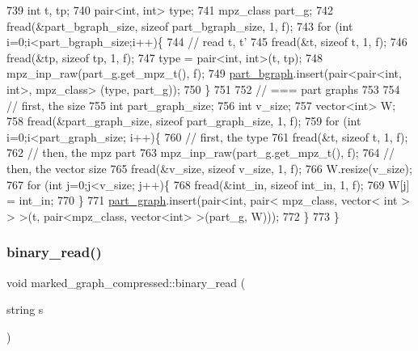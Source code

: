 \begin{DoxyCode}
739   \textcolor{keywordtype}{int} t, tp;
740   pair<int, int> type; 
741   mpz\_class part\_g; 
742   fread(&part\_bgraph\_size, \textcolor{keyword}{sizeof} part\_bgraph\_size, 1, f);
743   \textcolor{keywordflow}{for} (\textcolor{keywordtype}{int} i=0;i<part\_bgraph\_size;i++)\{
744     \textcolor{comment}{// read t, t'}
745     fread(&t, \textcolor{keyword}{sizeof} t, 1, f);
746     fread(&tp, \textcolor{keyword}{sizeof} tp, 1, f);
747     type = pair<int, int>(t, tp);
748     mpz\_inp\_raw(part\_g.get\_mpz\_t(), f);
749     \hyperlink{classmarked__graph__compressed_a7b3267063fba30b45eb21b3ba4e07536}{part\_bgraph}.insert(pair<pair<int, int>, mpz\_class> (type, part\_g));
750   \}
751 
752   \textcolor{comment}{// === part graphs}
753 
754   \textcolor{comment}{// first, the size}
755   \textcolor{keywordtype}{int} part\_graph\_size;
756   \textcolor{keywordtype}{int} v\_size;
757   vector<int> W; 
758   fread(&part\_graph\_size, \textcolor{keyword}{sizeof} part\_graph\_size, 1, f);
759   \textcolor{keywordflow}{for} (\textcolor{keywordtype}{int} i=0;i<part\_graph\_size; i++)\{
760     \textcolor{comment}{// first, the type}
761     fread(&t, \textcolor{keyword}{sizeof} t, 1, f);
762     \textcolor{comment}{// then, the mpz part}
763     mpz\_inp\_raw(part\_g.get\_mpz\_t(), f);
764     \textcolor{comment}{// then, the vector size}
765     fread(&v\_size, \textcolor{keyword}{sizeof} v\_size, 1, f);
766     W.resize(v\_size);
767     \textcolor{keywordflow}{for} (\textcolor{keywordtype}{int} j=0;j<v\_size; j++)\{
768       fread(&int\_in, \textcolor{keyword}{sizeof} int\_in, 1, f);
769       W[j] = int\_in;
770     \}
771     \hyperlink{classmarked__graph__compressed_ae179a4737e6eab905c18a94d44ef64b7}{part\_graph}.insert(pair<\textcolor{keywordtype}{int}, pair< mpz\_class, vector< int > > >(t, pair<mpz\_class, vector<int>
       >(part\_g, W)));
772   \}
773 \}
\end{DoxyCode}
\mbox{\label{classmarked__graph__compressed_a01c67fe4234738db6bb60459515c3ad8}} 
\subsubsection{\texorpdfstring{binary\+\_\+read()}{binary\_read()}\hspace{0.1cm}{\footnotesize\ttfamily [2/2]}}
{\footnotesize\ttfamily void marked\+\_\+graph\+\_\+compressed\+::binary\+\_\+read (\begin{DoxyParamCaption}\item[{string}]{s }\end{DoxyParamCaption})}

